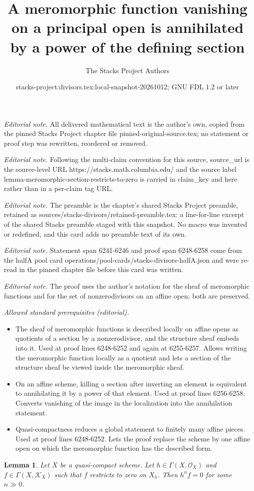 \documentclass[10pt,a4paper]{amsart}
\title{A meromorphic function vanishing on a principal open is annihilated by a power of the defining section}
\author{The Stacks Project Authors}
\date{stacks-project:divisors.tex:local-snapshot-20261012; GNU FDL 1.2 or later}
\theoremstyle{plain}
\newtheorem{lemma}[subsection]{Lemma}
\theoremstyle{definition}
\theoremstyle{remark}
\numberwithin{equation}{subsection}
\begin{document}
\maketitle
\noindent\textit{Editorial note.} All delivered mathematical text is the author's own, copied from the pinned Stacks Project chapter file pinned-original-source.tex; no statement or proof step was rewritten, reordered or removed.\par\medskip
\noindent\textit{Editorial note.} Following the multi-claim convention for this source, source\_url is the source-level URL https://stacks.math.columbia.edu/ and the source label lemma-meromorphic-section-restricts-to-zero is carried in claim\_key and here rather than in a per-claim tag URL.\par\medskip
\noindent\textit{Editorial note.} The preamble is the chapter's shared Stacks Project preamble, retained as sources/stacks-divisors/retained-preamble.tex: a line-for-line excerpt of the shared Stacks preamble staged with this snapshot. No macro was invented or redefined, and this card adds no preamble text of its own.\par\medskip
\noindent\textit{Editorial note.} Statement span 6241-6246 and proof span 6248-6258 come from the halfA pool card operations/pool-cards/stacks-divisors-halfA.json and were re-read in the pinned chapter file before this card was written.\par\medskip
\noindent\textit{Editorial note.} The proof uses the author's notation for the sheaf of meromorphic functions and for the set of nonzerodivisors on an affine open; both are preserved.\par\medskip
\noindent\textit{Allowed standard prerequisites (editorial).}\begin{itemize}
\item The sheaf of meromorphic functions is described locally on affine opens as quotients of a section by a nonzerodivisor, and the structure sheaf embeds into it. Used at proof lines 6248-6252 and again at 6255-6257. Allows writing the meromorphic function locally as a quotient and lets a section of the structure sheaf be viewed inside the meromorphic sheaf.
\item On an affine scheme, killing a section after inverting an element is equivalent to annihilating it by a power of that element. Used at proof lines 6256-6258. Converts vanishing of the image in the localization into the annihilation statement.
\item Quasi-compactness reduces a global statement to finitely many affine pieces. Used at proof lines 6248-6252. Lets the proof replace the scheme by one affine open on which the meromorphic function has the described form.
\end{itemize}\medskip
\begin{lemma}
\label{lemma-meromorphic-section-restricts-to-zero}
Let $X$ be a quasi-compact scheme. Let $h \in \Gamma(X, \mathcal{O}_X)$ and
$f \in \Gamma(X, \mathcal{K}_X)$ such that $f$ restricts
to zero on $X_h$. Then $h^n f = 0$ for some $n \gg 0$.
\end{lemma}
\end{document}
